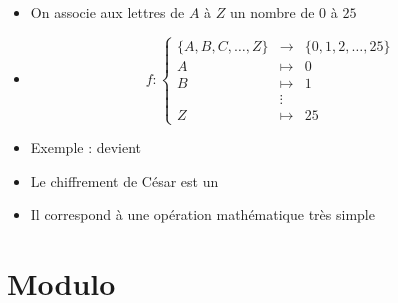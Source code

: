 \begin{frame}
\begin{itemize}[<+->]\setlength{\itemsep}{8pt}
  \item On associe aux lettres de $A$ à $Z$ un nombre de $0$ à $25$
  
  \item 
    $$f : \left\{
    \begin{array}{rcl}
    \big\{ A, B, C, \ldots, Z\big\} & \longrightarrow &\big\{ 0, 1, 2, \ldots, 25\big\} \\
    A & \longmapsto & 0\\
    B & \longmapsto & 1\\
    &\vdots&\\
    Z &\longmapsto & 25
    \end{array}
    \right.$$  
  
  \item Exemple :  devient 
  
  \item Le chiffrement de César est un 
  
  \item Il correspond à une opération mathématique très simple
\end{itemize}
\end{frame}




\section{Modulo}

